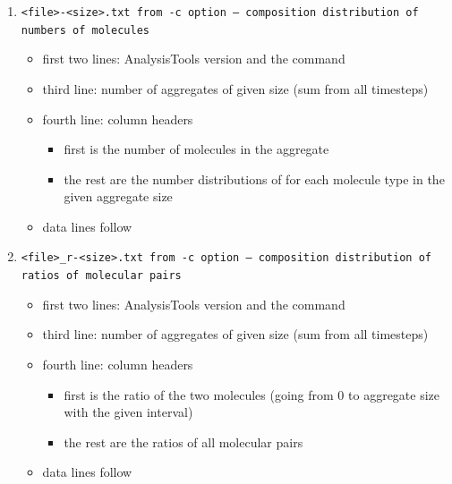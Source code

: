 \begin{enumerate}[nosep,leftmargin=20pt]
\begin{itemize}[nosep,leftmargin=5pt]
\begin{itemize}[nosep,leftmargin=10pt]
      \end{itemize}
      \item fourth line: note explaining the two mass definitions
      \item data lines follow
      \item the last two lines are the same as in \tt{<distr>}
    \end{itemize}
  \item \tt{<file>-<size>.txt} from \tt{-c} option -- composition distribution
    of numbers of molecules
    \begin{itemize}[nosep,leftmargin=5pt]
      \item first two lines: AnalysisTools version and the command
      \item third line: number of aggregates of given size (sum from all
        timesteps)
      \item fourth line: column headers
        \begin{itemize}[nosep,leftmargin=10pt]
          \item first is the number of molecules in the aggregate
          \item the rest are the number distributions of for each molecule type in
            the given aggregate size
        \end{itemize}
      \item data lines follow
    \end{itemize}
  \item \tt{<file>_r-<size>.txt} from \tt{-c} option -- composition distribution
    of ratios of molecular pairs
    \begin{itemize}[nosep,leftmargin=5pt]
      \item first two lines: AnalysisTools version and the command
      \item third line: number of aggregates of given size (sum from all
        timesteps)
      \item fourth line: column headers
        \begin{itemize}[nosep,leftmargin=10pt]
          \item first is the ratio of the two molecules (going from 0 to aggregate
            size with the given interval)
          \item the rest are the ratios of all molecular pairs
        \end{itemize}
      \item data lines follow
    \end{itemize}
\end{enumerate}
